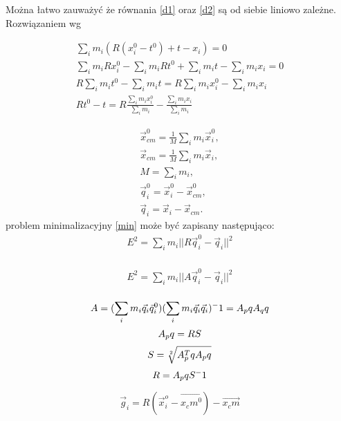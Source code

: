 Można łatwo zauważyć że równania \ref{d1} oraz \ref{d2} są od siebie liniowo
zależne. Rozwiązaniem wg 

\begin{eqnarray}
\sum_i m_i (R (x^0_i - t^0) + t - x_i) = 0\\
\sum_i m_i R x^0_i - \sum_i m_i R t^0 + \sum_i m_i t - \sum_i m_i x_i = 0\\
R \sum_i m_i t^0 - \sum_i m_i t = R \sum_i m_i x^0_i - \sum_i m_i x_i\\
R t^0 - t = R \frac{\sum_i m_i x^0_i}{\sum_i m_i} - \frac{\sum_i m_i
	x_i}{\sum_i m_i}
\end{eqnarray}


\begin{eqnarray}
\vec{x}_{cm}^0 = \frac{1}{M} \sum_i m_i \vec{x}_i^0,\\
\vec{x}_{cm} = \frac{1}{M} \sum_i m_i \vec{x}_i,\\
M = \sum_i m_i,\\
\vec{q}_i^0 = \vec{x}_i^0 - \vec{x}_{cm}^0,\\
\vec{q}_i = \vec{x}_i - \vec{x}_{cm}.
\end{eqnarray}
problem minimalizacyjny \ref{min} może być zapisany następująco:
\begin{eqnarray}
E^2 = \sum_i m_i || R\vec{q}_i^0 - \vec{q}_i||^2 \\
\end{eqnarray}

\begin{eqnarray}
E^2 = \sum_i m_i || A \vec{q}_i^0 - \vec{q}_i||^2 \\
\end{eqnarray}

\begin{equation}
A = (\sum_i m_i \vec{q}_i \vec{q}_i^0)(\sum_i m_i \vec{q}_i \vec{q}_i)^-1 = A_pq A_qq\\
\end{equation}
\begin{equation}
A_pq = RS \\
\end{equation}
\begin{equation}
S = \sqrt[2]{A^T_pq A_pq} \\
\end{equation}
\begin{equation}
R = A_pq S^-1 \\
\end{equation}

\begin{equation}
\vec{g}_i = R (\vec{x}_i^o - \vec{x_cm^0}) -  \vec{x_cm}
\end{equation}

